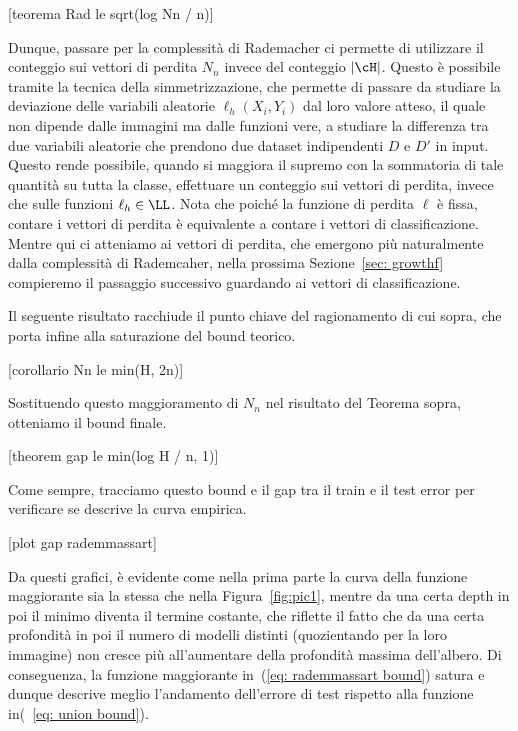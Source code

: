 [teorema Rad le sqrt(log Nn / n)]

Dunque, passare per la complessità di Rademacher ci permette di utilizzare il conteggio sui vettori di perdita $N_n$ invece del conteggio $|\cH|$. Questo è possibile tramite la tecnica della simmetrizzazione, che permette di passare da studiare la deviazione delle variabili aleatorie $\ell_h(X_i,Y_i)$ dal loro valore atteso, il quale non dipende dalle immagini ma dalle funzioni vere, a studiare la differenza tra due variabili aleatorie che prendono due dataset indipendenti $D$ e $D'$ in input. Questo rende possibile, quando si maggiora il supremo con la sommatoria di tale quantità su tutta la classe, effettuare un conteggio sui vettori di perdita, invece che sulle funzioni $\ell_h\in\LL$. Nota che poiché la funzione di perdita $\ell$ è fissa, contare i vettori di perdita è equivalente a contare i vettori di classificazione. Mentre qui ci atteniamo ai vettori di perdita, che emergono più naturalmente dalla complessità di Rademcaher, nella prossima Sezione~\ref{sec: growthf} compieremo il passaggio successivo guardando ai vettori di classificazione. 

Il seguente risultato racchiude il punto chiave del ragionamento di cui sopra, che porta infine alla saturazione del bound teorico. 

[corollario Nn le min(H, 2n)]

Sostituendo questo maggioramento di $N_n$ nel risultato del Teorema sopra, otteniamo il bound finale.

[theorem gap le min(log H / n, 1)]

Come sempre, tracciamo questo bound e il gap tra il train e il test error per verificare se descrive la curva empirica.  

[plot gap rademmassart]

Da questi grafici, è evidente come nella prima parte la curva della funzione maggiorante sia la stessa che nella Figura~\ref{fig:pic1}, mentre da una certa depth in poi il minimo diventa il termine costante, che riflette il fatto che da una certa profondità in poi il numero di modelli distinti (quozientando per la loro immagine) non cresce più all'aumentare della profondità massima dell'albero. 
Di conseguenza, la funzione maggiorante in~(\ref{eq: rademmassart bound}) satura e dunque descrive meglio l'andamento dell'errore di test rispetto alla funzione in(~\ref{eq: union bound}). 

